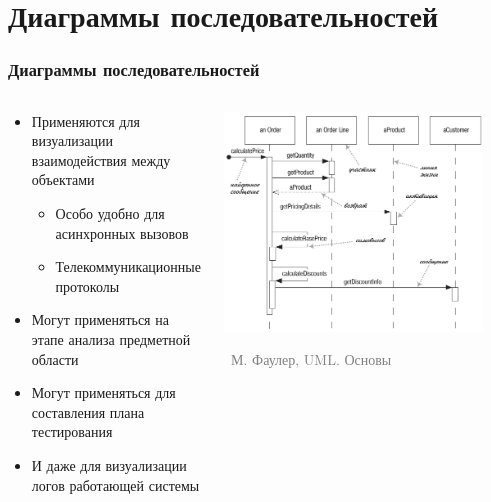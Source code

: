 \documentclass[xetex,mathserif,serif]{beamer}
\newcommand{\attribution}[1] {
	\vspace{-5mm}\begin{flushright}\begin{scriptsize}\textcolor{gray}{\textcopyright\, #1}\end{scriptsize}\end{flushright}
}
\begin{document}
	\section{Диаграммы последовательностей}

	\begin{frame}
		\frametitle{Диаграммы последовательностей}
		\begin{columns}
			\begin{column}{0.5\textwidth}
				\begin{itemize}
					\item Применяются для визуализации взаимодействия между объектами
					\begin{itemize}
						\item Особо удобно для асинхронных вызовов
						\item Телекоммуникационные протоколы
					\end{itemize}
					\item Могут применяться на этапе анализа предметной области
					\item Могут применяться для составления плана тестирования
					\item И даже для визуализации логов работающей системы
				\end{itemize}
			\end{column}
			\begin{column}{0.5\textwidth}
				\begin{center}
					\includegraphics[width=0.9\textwidth]{sequenceDiagramSyntax.png}
					\attribution{М. Фаулер, UML. Основы}
				\end{center}
			\end{column}
		\end{columns}
	\end{frame}
\end{document}
